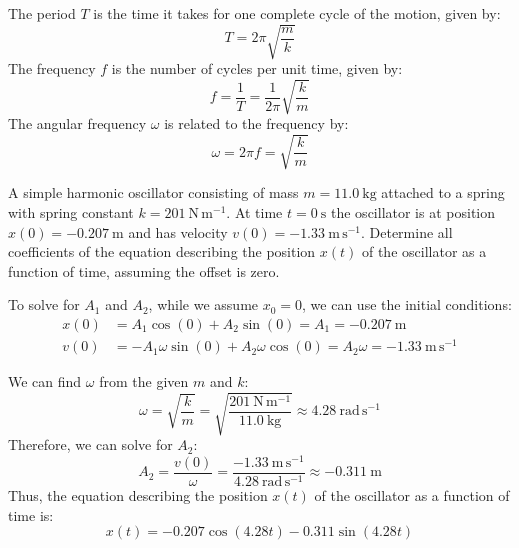 \documentclass[11pt]{report}
\begin{document}
\begin{definition}
    The period \( T \) is the time it takes for one complete cycle of the motion, given by:
    \begin{equation}
        T = 2\pi \sqrt{\frac{m}{k}}
    \end{equation}
    The frequency \( f \) is the number of cycles per unit time, given by:
    \begin{equation}
        f = \frac{1}{T} = \frac{1}{2\pi} \sqrt{\frac{k}{m}}
    \end{equation}
    The angular frequency \( \omega \) is related to the frequency by:
    \begin{equation}
        \omega = 2\pi f = \sqrt{\frac{k}{m}}
    \end{equation}
    
\end{definition}

\begin{example}
    A simple harmonic oscillator consisting of mass \(m = 11.0\ \mathrm{kg}\) attached to a spring with spring constant \(k = 201\ \mathrm{N\,m^{-1}}\). At time \(t=0\ \mathrm{s}\) the oscillator is at position \(x(0) = -0.207\ \mathrm{m}\) and has velocity \(v(0) = -1.33\ \mathrm{m\,s^{-1}}\). Determine all coefficients of the equation describing the position \(x(t)\) of the oscillator as a function of time, assuming the offset is zero. 

    To solve for $A_1$ and $A_2$, while we assume $x_0 = 0$, we can use the initial conditions:
    \begin{align*}
        x(0) &= A_1 \cos(0) + A_2 \sin(0) = A_1 = -0.207\ \mathrm{m} \\
        v(0) &= -A_1 \omega \sin(0) + A_2 \omega \cos(0) = A_2 \omega = -1.33\ \mathrm{m\,s^{-1}}
    \end{align*}

    We can find $\omega$ from the given $m$ and $k$:
    $$
    \omega = \sqrt{\frac{k}{m}} = \sqrt{\frac{201\ \mathrm{N\,m^{-1}}}{11.0\ \mathrm{kg}}} \approx 4.28\ \mathrm{rad\,s^{-1}}
    $$
    Therefore, we can solve for $A_2$:
    $$
    A_2 = \frac{v(0)}{\omega} = \frac{-1.33\ \mathrm{m\,s^{-1}}}{4.28\ \mathrm{rad\,s^{-1}}} \approx -0.311\ \mathrm{m}
    $$
    Thus, the equation describing the position \(x(t)\) of the oscillator as a function of time is:
    $$
    x(t) = -0.207 \cos(4.28 t) - 0.311 \sin(4.28 t)
    $$
\end{example}
\end{document}

